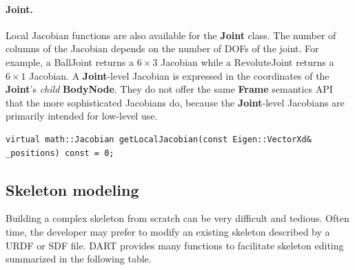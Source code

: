 \paragraph{Joint.} Local Jacobian functions are also available for
the \textbf{Joint} class. The number of columns of the Jacobian depends on the
number of DOFs of the joint. For example, a BallJoint returns a $6
\times 3$ Jacobian while a RevoluteJoint returns a $6 \times 1$ Jacobian. A \textbf{Joint}-level Jacobian is expressed in the coordinates of the \textbf{Joint}'s \textit{child} \textbf{BodyNode}. They do not offer the same \textbf{Frame} semantics API that the more sophisticated Jacobians do, because the \textbf{Joint}-level Jacobians are primarily intended for low-level use.

\begin{lstlisting}[caption=Joint.h]
virtual math::Jacobian getLocalJacobian(const Eigen::VectorXd&
_positions) const = 0;
\end{lstlisting}






\subsection{Skeleton modeling}
Building a complex skeleton from scratch can be very
difficult and tedious. Often time, the developer may prefer to modify an
existing skeleton described by a URDF or SDF file. DART provides many
functions to facilitate skeleton editing summarized in the following
table.

